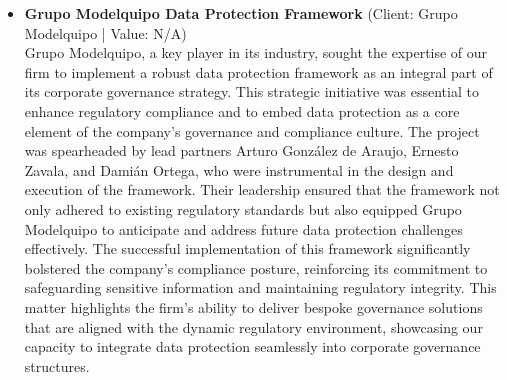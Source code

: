\documentclass[11pt]{article}
\begin{document}
\begin{itemize}
The stakes were considerable, involving potential regulatory exposure that necessitated a robust compliance framework. The firm meticulously designed and implemented a comprehensive suite of internal policies specifically tailored to enhance data protection measures. This initiative included the development of detailed training programs aimed at educating employees across various departments, embedding a culture of compliance throughout the organization. 

Lead partners Arturo González de Araujo, Ernesto Zavala, and Damián Ortega were instrumental in orchestrating these initiatives. They ensured that the policies not only met current regulatory requirements but were also adaptable to future changes, demonstrating the firm's proactive approach to compliance. 

The strategic deployment of legal expertise and practical training significantly fortified Grupo Excelsior's compliance posture. This proactive restructuring effectively reduced the client's regulatory exposure, safeguarding them against potential legal challenges. The matter exemplifies the firm's capability to deliver tailored compliance solutions that address complex regulatory landscapes, reinforcing the submission's thesis of providing strategic legal advisory in high-stakes environments.
\item \textbf{Grupo Modelquipo Data Protection Framework} (Client: Grupo Modelquipo | Value: N/A)\\ Grupo Modelquipo, a key player in its industry, sought the expertise of our firm to implement a robust data protection framework as an integral part of its corporate governance strategy. This strategic initiative was essential to enhance regulatory compliance and to embed data protection as a core element of the company's governance and compliance culture. The project was spearheaded by lead partners Arturo González de Araujo, Ernesto Zavala, and Damián Ortega, who were instrumental in the design and execution of the framework. Their leadership ensured that the framework not only adhered to existing regulatory standards but also equipped Grupo Modelquipo to anticipate and address future data protection challenges effectively. The successful implementation of this framework significantly bolstered the company's compliance posture, reinforcing its commitment to safeguarding sensitive information and maintaining regulatory integrity. This matter highlights the firm's ability to deliver bespoke governance solutions that are aligned with the dynamic regulatory environment, showcasing our capacity to integrate data protection seamlessly into corporate governance structures.

\end{itemize}
\end{document}

